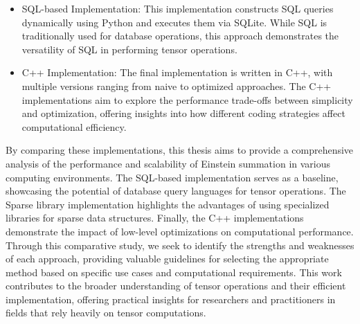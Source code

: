 \begin{itemize}
    \item SQL-based Implementation: This implementation constructs SQL queries dynamically
          using Python and executes them via SQLite. While SQL is traditionally used for
          database operations, this approach demonstrates the versatility of SQL in
          performing tensor operations.
    \item C++ Implementation: The final implementation is written in C++, with multiple
          versions ranging from naive to optimized approaches. The C++ implementations
          aim to explore the performance trade-offs between simplicity and optimization,
          offering insights into how different coding strategies affect computational efficiency.
\end{itemize}

By comparing these implementations, this thesis aims to provide a comprehensive
analysis of the performance and scalability of Einstein summation in various
computing environments. The SQL-based implementation serves as a baseline,
showcasing the potential of database query languages for tensor operations.
The Sparse library implementation highlights the advantages of using specialized
libraries for sparse data structures. Finally, the C++ implementations demonstrate
the impact of low-level optimizations on computational performance.
\\
Through this comparative study, we seek to identify the strengths and weaknesses
of each approach, providing valuable guidelines for selecting the appropriate
method based on specific use cases and computational requirements. This work
contributes to the broader understanding of tensor operations and their efficient
implementation, offering practical insights for researchers and practitioners
in fields that rely heavily on tensor computations.